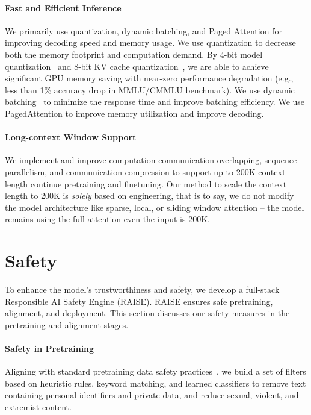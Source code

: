 \documentclass[numbers,sort&compress]{article}
\begin{document}
\paragraph{Fast and Efficient Inference}
We primarily use quantization, dynamic batching, and Paged Attention for improving decoding speed and memory usage.
We use quantization to decrease both the memory footprint and computation demand. 
By 4-bit model quantization~\citep{wu2023understanding} and 8-bit KV cache quantization~\citep{dettmers2022llm}, we are able to achieve significant GPU memory saving with near-zero performance degradation (e.g., less than 1$\%$ accuracy drop in MMLU/CMMLU benchmark). 
We use dynamic batching~\citep{gyeong280922} to minimize the response time and improve batching efficiency.
We use PagedAttention\cite{kwon2023efficient} to improve memory utilization and improve decoding. 

\paragraph{Long-context Window Support} 
We implement and improve computation-communication overlapping, sequence parallelism, and communication compression to support up to 200K context length continue pretraining and finetuning. 
Our method to scale the context length to 200K is \textit{solely} based on engineering, that is to say, we do not modify the model architecture like sparse, local, or sliding window attention -- the model remains using the full attention even the input is 200K.  

\section{Safety}
\label{sec:safety}
To enhance the model's trustworthiness and safety, we develop a full-stack Responsible AI Safety Engine (RAISE). 
RAISE ensures safe pretraining, alignment, and deployment.
This section discusses our safety measures in the pretraining and alignment stages.

\paragraph{Safety in Pretraining}
Aligning with standard pretraining data safety practices~\citep{llama2, rae2021scaling, brown2020language}, we build a set of filters based on heuristic rules, keyword matching, and learned classifiers
to remove text containing personal identifiers and private data, and reduce sexual, violent, and extremist content. 
\end{document}
